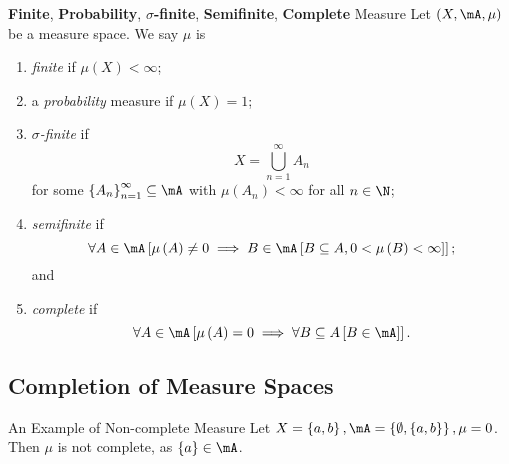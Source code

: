 \documentclass[pmath451]{subfiles}
\begin{document}
    \begin{definition}{\textbf{Finite}, \textbf{Probability}, \textbf{$\sigma$-finite}, \textbf{Semifinite}, \textbf{Complete} Measure}
        Let $\left( X,\mA,\mu \right)$ be a measure space. We say $\mu$ is
        \begin{enumerate}
            \item \emph{finite} if $\mu\left( X \right) < \infty$;
            \item a \emph{probability} measure if $\mu\left( X \right) = 1$;
            \item \emph{$\sigma$-finite} if
                \begin{equation*}
                    X = \bigcup^{\infty}_{n=1} A_n
                \end{equation*}
                for some $\left\lbrace A_n \right\rbrace^{\infty}_{n=1}\subseteq\mA$ with $\mu\left( A_n \right)<\infty$ for all $n\in\N$; 
            \item \emph{semifinite} if
                \begin{equation*}
                    \forall A\in\mA \left[ \mu\left( A \right)\neq 0 \implies B\in\mA \left[ B\subseteq A, 0<\mu\left( B \right)<\infty \right] \right];
                \end{equation*}
                and
            \item \emph{complete} if 
                \begin{equation*}
                    \forall A\in\mA \left[ \mu\left( A \right) = 0 \implies \forall B\subseteq A \left[ B\in\mA \right] \right].
                \end{equation*}
        \end{enumerate}
    \end{definition}
    
    \clearpage

    \subsection{Completion of Measure Spaces}
    
    \begin{example}{An Example of Non-complete Measure}
        Let $X = \left\lbrace a,b \right\rbrace, \mA = \left\lbrace \emptyset, \left\lbrace a,b \right\rbrace \right\rbrace, \mu = 0$. Then $\mu$ is not complete, as $\left\lbrace a \right\rbrace\in\mA$.
    \end{example}

    \rruleline
\end{document}
